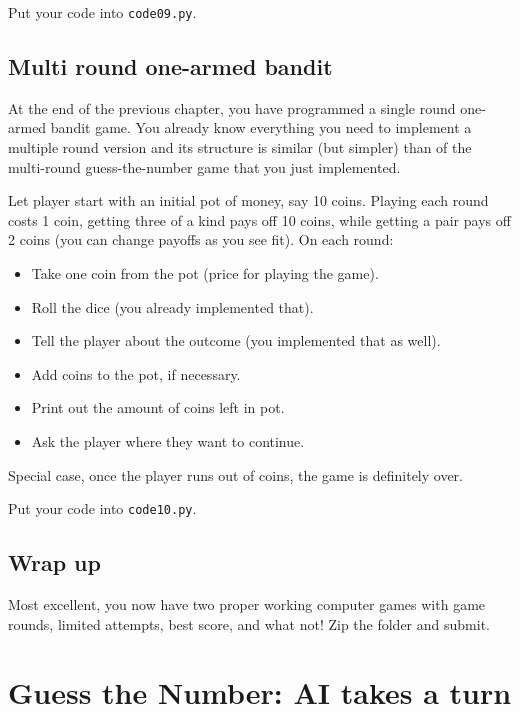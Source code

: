 \documentclass[
]{book}
\providecommand{\tightlist}{%
  \setlength{\itemsep}{0pt}\setlength{\parskip}{0pt}}
\begin{document}
Put your code into \texttt{code09.py}.

\hypertarget{multi-round-one-armed-bandit}{%
\section{Multi round one-armed bandit}\label{multi-round-one-armed-bandit}}

At the end of the previous chapter, you have programmed a single round one-armed bandit game. You already know everything you need to implement a multiple round version and its structure is similar (but simpler) than of the multi-round guess-the-number game that you just implemented.

Let player start with an initial pot of money, say 10 coins. Playing each round costs 1 coin, getting three of a kind pays off 10 coins, while getting a pair pays off 2 coins (you can change payoffs as you see fit). On each round:

\begin{itemize}
\tightlist
\item
  Take one coin from the pot (price for playing the game).
\item
  Roll the dice (you already implemented that).
\item
  Tell the player about the outcome (you implemented that as well).
\item
  Add coins to the pot, if necessary.
\item
  Print out the amount of coins left in pot.
\item
  Ask the player where they want to continue.
\end{itemize}

Special case, once the player runs out of coins, the game is definitely over.

Put your code into \texttt{code10.py}.

\hypertarget{wrap-up}{%
\section{Wrap up}\label{wrap-up}}

Most excellent, you now have two proper working computer games with game rounds, limited attempts, best score, and what not! Zip the folder and submit.

\hypertarget{guess-the-number-ai}{%
\chapter{Guess the Number: AI takes a turn}\label{guess-the-number-ai}}
\end{document}
